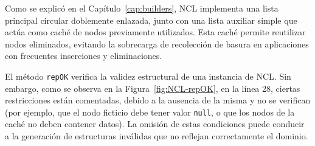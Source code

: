 Como se explicó en el Capítulo~\ref{cap:builders}, NCL implementa una lista principal circular doblemente enlazada, 
junto con una lista auxiliar simple que actúa como caché de nodos previamente utilizados. Esta caché permite reutilizar 
nodos eliminados, evitando la sobrecarga de recolección de basura en aplicaciones con frecuentes inserciones y 
eliminaciones.

El método \texttt{repOK} verifica la validez estructural de una instancia de NCL. Sin embargo, como se observa en la 
Figura~\ref{fig:NCL-repOK}, en la línea 28, ciertas restricciones están comentadas, debido a la ausencia de la misma y no se verifican (por ejemplo, que el nodo 
ficticio debe tener valor \texttt{null}, o que los nodos de la caché no deben contener datos). La omisión de estas 
condiciones puede conducir a la generación de estructuras inválidas que no reflejan correctamente el dominio.


